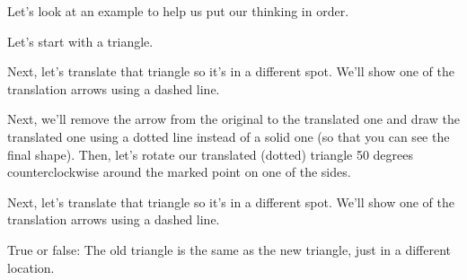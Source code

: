 \documentclass{ximera}
\begin{document}
Let's look at an example to help us put our thinking in order.
\begin{example}
Let's start with a triangle.
\begin{center}\end{center}
Next, let's translate that triangle so it's in a different spot. We'll show one of the translation arrows using a dashed line.
\begin{center}\end{center}
Next, we'll remove the arrow from the original to the translated one and draw the translated one using a dotted line instead of a solid one (so that you can see the final shape). Then, let's rotate our translated (dotted) triangle 50 degrees counterclockwise around the marked point on one of the sides.
\begin{center}\end{center}
Next, let's translate that triangle so it's in a different spot. We'll show one of the translation arrows using a dashed line.
\begin{center}\end{center}

\begin{question}
True or false: The old triangle is the same as the new triangle, just in a different location.
\begin{multipleChoice}
\end{multipleChoice}
\end{question}


\end{example}
\end{document}
